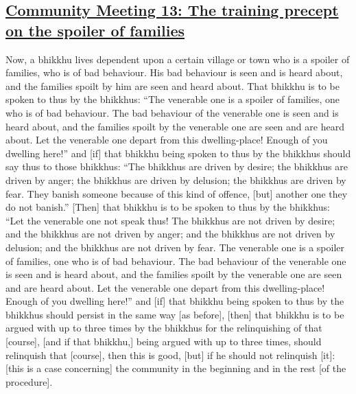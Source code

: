 \subsection*{\hyperref[sd13]{Community Meeting 13: The training precept on the spoiler of families}}
\label{comm13}
Now, a bhikkhu lives dependent upon a certain village or town who is a spoiler of families, who is of bad behaviour. His bad behaviour is seen and is heard about, and the families spoilt by him are seen and heard about. That bhikkhu is to be spoken to thus by the bhikkhus: ``The venerable one is a spoiler of families, one who is of bad behaviour. The bad behaviour of the venerable one is seen and is heard about, and the families spoilt by the venerable one are seen and are heard about. Let the venerable one depart from this dwelling-place! Enough of you dwelling here!'' and [if] that bhikkhu being spoken to thus by the bhikkhus should say thus to those bhikkhus: ``The bhikkhus are driven by desire; the bhikkhus are driven by anger; the bhikkhus are driven by delusion; the bhikkhus are driven by fear. They banish someone because of this kind of offence, [but] another one they do not banish.'' [Then] that bhikkhu is to be spoken to thus by the bhikkhus: ``Let the venerable one not speak thus! The bhikkhus are not driven by desire; and the bhikkhus are not driven by anger; and the bhikkhus are not driven by delusion; and the bhikkhus are not driven by fear. The venerable one is a spoiler of families, one who is of bad behaviour. The bad behaviour of the venerable one is seen and is heard about, and the families spoilt by the venerable one are seen and are heard about. Let the venerable one depart from this dwelling-place! Enough of you dwelling here!'' and [if] that bhikkhu being spoken to thus by the bhikkhus should persist in the same way [as before], [then] that bhikkhu is to be argued with up to three times by the bhikkhus for the relinquishing of that [course], [and if that bhikkhu,] being argued with up to three times, should relinquish that [course], then this is good, [but] if he should not relinquish [it]: [this is a case concerning] the community in the beginning and in the rest [of the procedure].



\medskip

